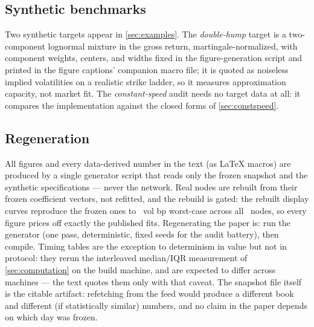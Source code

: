 \subsection{Synthetic benchmarks}

Two synthetic targets appear in \cref{sec:examples}.  The
\emph{double-hump} target is a two-component lognormal mixture in the
gross return, martingale-normalized, with component weights, centers,
and widths fixed in the figure-generation script and printed in the
figure captions' companion macro file; it is quoted as noiseless implied
volatilities on a realistic strike ladder, so it measures approximation
capacity, not market fit.  The \emph{constant-speed} audit needs no
target data at all: it compares the implementation against the closed
forms of \cref{sec:constspeed}.

\subsection{Regeneration}

All figures and every data-derived number in the text (as LaTeX macros)
are produced by a single generator script that reads only the frozen
snapshot and the synthetic specifications --- never the network.  Real
nodes are rebuilt from their frozen coefficient vectors, not refitted,
and the rebuild is gated: the rebuilt display curves reproduce the
frozen ones to \MacRebuildWorstBp\ vol bp worst-case across all
\MacSnapNodeCount\ nodes, so every figure prices off exactly the
published fits.
Regenerating the paper is: run the generator (one pass, deterministic,
fixed seeds for the audit battery), then compile.  Timing tables are the
exception to determinism in value but not in protocol: they rerun the
interleaved median/IQR measurement of \cref{sec:computation} on the
build machine, and are expected to differ across machines --- the text
quotes them only with that caveat.  The snapshot file itself is the
citable artifact: refetching from the feed would produce a different
book and different (if statistically similar) numbers, and no claim in
the paper depends on which day was frozen.
